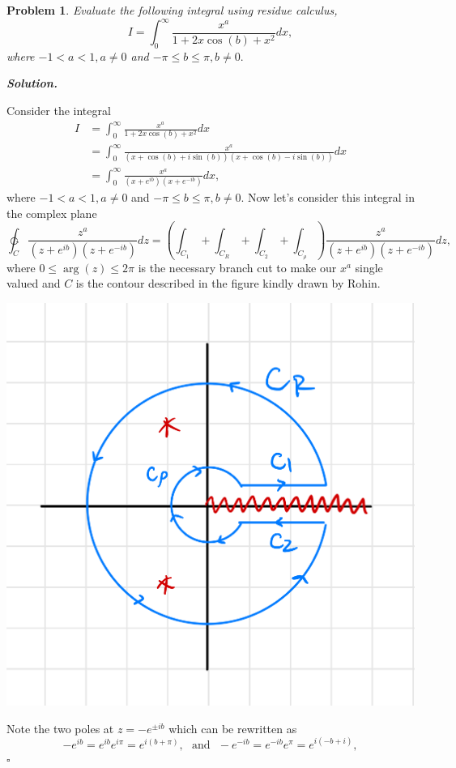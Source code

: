 \documentclass[12pt]{report}
\newtheorem{problem}{Problem}
\newenvironment{solution}[1][\it{Solution}]{\textbf{#1. } }{$\square$}
\newcommand{\paren}[1]{{\left(#1\right)}} %
\def\ointcc{{\ointctrclockwise}}
\begin{document}
\newpage



\begin{problem}
    Evaluate the following integral using residue calculus,
    \[ 
        I = \int_0^\infty \frac{x^a}{1 + 2x \cos(b) + x^2}dx,
    \]
    where $-1< a < 1, a\neq 0$ and $-\pi \le b \le \pi, b\neq 0.$ 
\end{problem}

\begin{solution}

    \noindent
    Consider the integral
    \begin{align*}
        I &= \int_0^\infty \frac{x^a}{1 + 2x \cos(b) + x^2}dx\\
        &= \int_0^\infty \frac{x^a}{(x + \cos(b) + i\sin(b))(x + \cos(b) - i\sin(b))}dx\\
        &= \int_0^\infty \frac{x^a}{(x + e^{ib})(x + e^{-ib})}dx,
    \end{align*} 
    where $-1< a < 1, a\neq 0$ and $-\pi \le b \le \pi, b\neq 0.$
    Now let's consider this integral in the complex plane
    \[ 
        \ointcc_C \frac{z^a}{(z + e^{ib})(z + e^{-ib})}dz = \paren{\int_{C_1} + \int_{C_R} + \int_{C_2} + \int_{C_\rho}}\frac{z^a}{(z + e^{ib})(z + e^{-ib})}dz,
    \]
    where $0 \leq \arg(z) \le 2\pi$ is the necessary branch cut to make our $x^a$ single valued and $C$ is the contour described in the figure kindly drawn by Rohin.
    \begin{center}
        \includegraphics[width=.5\textwidth]{fig2.png}
    \end{center}
    Note the two poles at $z= -e^{\pm ib}$ which can be rewritten as 
    \[
        -e^{ib} = e^{ib}e^{i\pi} = e^{i(b + \pi)}, ~~~ \text{and} ~~~ -e^{-ib} = e^{-ib}e^{\pi} = e^{i(-b + i)},
\]
\end{solution}
\end{document}
